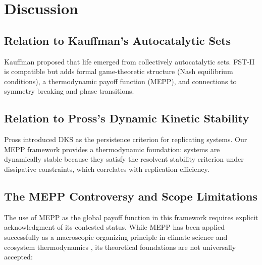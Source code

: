 \documentclass[12pt,a4paper]{article}
\theoremstyle{remark}
\begin{document}
\section{Discussion}
\label{sec:discussion}

\subsection{Relation to Kauffman's Autocatalytic Sets}

Kauffman \citep{Kauffman1993} proposed that life emerged from collectively autocatalytic sets. FST-II is compatible but adds formal game-theoretic structure (Nash equilibrium conditions), a thermodynamic payoff function (MEPP), and connections to symmetry breaking and phase transitions.

\subsection{Relation to Pross's Dynamic Kinetic Stability}

Pross \citep{Pross2012} introduced DKS as the persistence criterion for replicating systems. Our MEPP framework provides a thermodynamic foundation: systems are dynamically stable because they satisfy the resolvent stability criterion under dissipative constraints, which correlates with replication efficiency.

\subsection{The MEPP Controversy and Scope Limitations}

The use of MEPP as the global payoff function in this framework requires explicit acknowledgment of its contested status. While MEPP has been applied successfully as a macroscopic organizing principle in climate science and ecosystem thermodynamics \citep{MEPP2006}, its theoretical foundations are not universally accepted:
\end{document}
